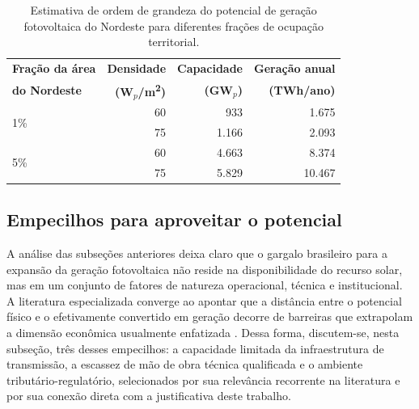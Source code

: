 \begin{table}[htbp]
\centering
\caption{Estimativa de ordem de grandeza do potencial de geração fotovoltaica do
Nordeste para diferentes frações de ocupação territorial.}
\label{tab:potencial_nordeste}
\begin{tabular}{lrrr}
\hline
\textbf{Fração da área} & \textbf{Densidade} & \textbf{Capacidade} & \textbf{Geração anual} \\
\textbf{do Nordeste}    & \textbf{(W$_p$/m\textsuperscript{2})} & \textbf{(GW$_p$)} & \textbf{(TWh/ano)} \\
\hline
\multirow{2}{*}{1\%} & 60 &   933 & 1.675 \\
                     & 75 & 1.166 & 2.093 \\
\hline
\multirow{2}{*}{5\%} & 60 & 4.663 &  8.374 \\
                     & 75 & 5.829 & 10.467 \\
\hline
\end{tabular}
\end{table}

\subsection{Empecilhos para aproveitar o potencial}
\label{subsec:empecilhos}

A análise das subseções anteriores deixa claro que o gargalo brasileiro para a
expansão da geração fotovoltaica não reside na disponibilidade do recurso solar,
mas em um conjunto de fatores de natureza operacional, técnica e
institucional. A literatura especializada converge ao apontar que a distância
entre o potencial físico e o efetivamente convertido em geração decorre de
barreiras que extrapolam a dimensão econômica usualmente enfatizada
\cite{Fratea2017,Queiroz2020}. Dessa forma, discutem-se, nesta subseção, três desses
empecilhos: a capacidade limitada da infraestrutura de transmissão, a
escassez de mão de obra técnica qualificada e o ambiente tributário-regulatório, selecionados por sua relevância recorrente na literatura e por sua conexão
direta com a justificativa deste trabalho.


